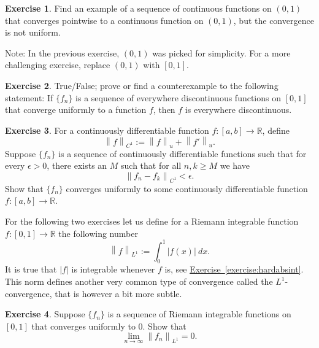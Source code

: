 \documentclass[12pt]{book}
\newcommand{\abs}[1]{\left\lvert {#1} \right\rvert}
\newcommand{\norm}[1]{\left\lVert {#1} \right\rVert}
\newcommand{\R}{{\mathbb{R}}}
\theoremstyle{plain}
\theoremstyle{remark}
\theoremstyle{definition}
\newenvironment{exnote}{\small}{}
\theoremstyle{exercise}
\newtheorem{exercise}{Exercise}[section]
\theoremstyle{example}
\newcommand{\exerciseref}[1]{\hyperref[#1]{Exercise~\ref*{#1}}}
\begin{document}
\begin{exercise}
Find an example of a sequence of continuous functions on $(0,1)$ that converges 
pointwise to a continuous function on $(0,1)$, but the convergence is not
uniform.
\end{exercise}

\begin{exnote}
Note: In the previous exercise, $(0,1)$ was picked for simplicity.  For a
more challenging exercise, replace $(0,1)$ with $[0,1]$.
\end{exnote}

\begin{exercise}
True/False; prove or find a counterexample to the following statement:
If $\{ f_n \}$ is a sequence of everywhere discontinuous functions on $[0,1]$
that converge uniformly to a function $f$, then $f$ is everywhere
discontinuous.
\end{exercise}

\begin{exercise} \label{c1uniflim:exercise}
For a continuously differentiable function $f \colon [a,b] \to \R$, define
\begin{equation*}
\norm{f}_{C^1} := \norm{f}_u + \norm{f'}_u .
\end{equation*}
Suppose $\{ f_n \}$ is a sequence of continuously differentiable
functions such that for every $\epsilon >0$, there exists an $M$
such that for all $n,k \geq M$ we have
\begin{equation*}
\norm{f_n-f_k}_{C^1} < \epsilon .
\end{equation*}
Show that $\{ f_n \}$ converges uniformly to some continuously differentiable
function $f \colon [a,b] \to \R$.
\end{exercise}

\begin{exnote}
For the following two exercises let us define for a Riemann integrable
function $f \colon [0,1] \to
\R$ the following number
\begin{equation*}
\norm{f}_{L^1} := 
\int_0^1 \abs{f(x)}~dx .
\end{equation*}
It is true that $\abs{f}$ is integrable whenever $f$ is, see
\exerciseref{exercise:hardabsint}.
This norm defines another very common type of
convergence called the $L^1$-convergence, that is however a bit more
subtle.
\end{exnote}

\begin{exercise}
Suppose $\{ f_n \}$ is a sequence of Riemann integrable functions on $[0,1]$
that converges uniformly
to $0$.  Show that
\begin{equation*}
\lim_{n\to\infty} \norm{f_n}_{L^1} = 0 .
\end{equation*}
\end{exercise}
\end{document}
